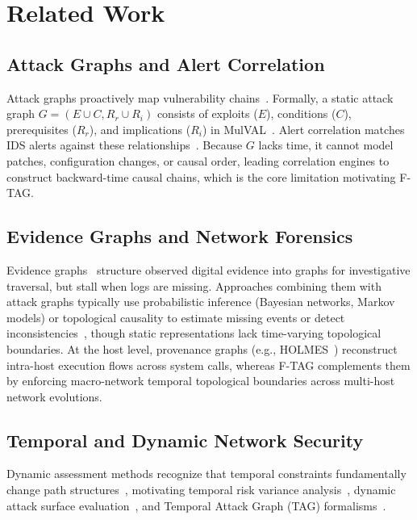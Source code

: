 \documentclass[12pt]{article}
\begin{document}
\section{Related Work}\label{sec:related-work}

\subsection{Attack Graphs and Alert Correlation}\label{sec:static-ag}

Attack graphs proactively map vulnerability chains~\cite{Noel2018,Lallie2020}. Formally, a static attack graph $G = (E \cup C, R_{r} \cup R_{i})$ consists of exploits ($E$), conditions ($C$), prerequisites ($R_{r}$), and implications ($R_{i}$) in MulVAL~\cite{mulval,6263942}. Alert correlation matches IDS alerts against these relationships~\cite{10.1145/586110.586144,ning2004building,husak2019survey}. Because $G$ lacks time, it cannot model patches, configuration changes, or causal order, leading correlation engines to construct backward-time causal chains, which is the core limitation motivating F-TAG.

\subsection{Evidence Graphs and Network Forensics}

Evidence graphs~\cite{wang2008evidence,he2016network} structure observed digital evidence into graphs for investigative traversal, but stall when logs are missing. Approaches combining them with attack graphs typically use probabilistic inference (Bayesian networks, Markov models) or topological causality to estimate missing events or detect inconsistencies~\cite{liu2012using,zhang2015detecting,Frigault2017}, though static representations lack time-varying topological boundaries. At the host level, provenance graphs (e.g., HOLMES~\cite{milajerdi2019holmes}) reconstruct intra-host execution flows across system calls, whereas F-TAG complements them by enforcing macro-network temporal topological boundaries across multi-host network evolutions.
  
\subsection{Temporal and Dynamic Network Security}

Dynamic assessment methods recognize that temporal constraints fundamentally change path structures~\cite{Holme,Casteigts2012}, motivating temporal risk variance analysis~\cite{Awan2016}, dynamic attack surface evaluation~\cite{ENOCH2019102448}, and Temporal Attack Graph (TAG) formalisms~\cite{Gain2023}. 
\end{document}
